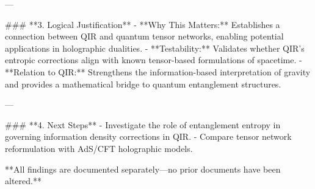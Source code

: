 ---

### **3. Logical Justification**
- **Why This Matters:** Establishes a connection between QIR and quantum tensor networks, enabling potential applications in holographic dualities.
- **Testability:** Validates whether QIR’s entropic corrections align with known tensor-based formulations of spacetime.
- **Relation to QIR:** Strengthens the information-based interpretation of gravity and provides a mathematical bridge to quantum entanglement structures.

---

### **4. Next Steps**
- Investigate the role of entanglement entropy in governing information density corrections in QIR.
- Compare tensor network reformulation with AdS/CFT holographic models.

**All findings are documented separately—no prior documents have been altered.**

